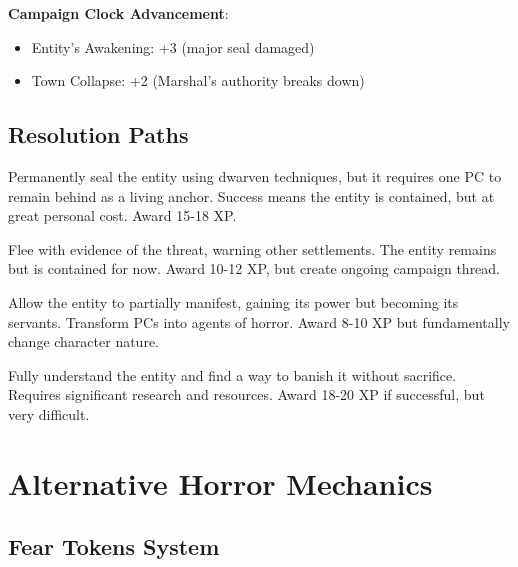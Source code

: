 \documentclass[11pt]{article}
\begin{document}
\textbf{Campaign Clock Advancement}:
\begin{itemize}[leftmargin=*]
\item Entity's Awakening: +3 (major seal damaged)
\item Town Collapse: +2 (Marshal's authority breaks down)
\end{itemize}

\subsection*{Resolution Paths}

\begin{description}[leftmargin=*]
\item[The Sacrifice] Permanently seal the entity using dwarven techniques, but it requires one PC to remain behind as a living anchor. Success means the entity is contained, but at great personal cost. Award 15-18 XP.
\item[The Escape] Flee with evidence of the threat, warning other settlements. The entity remains but is contained for now. Award 10-12 XP, but create ongoing campaign thread. 
\item[The Corruption] Allow the entity to partially manifest, gaining its power but becoming its servants. Transform PCs into agents of horror. Award 8-10 XP but fundamentally change character nature.
\item[The Investigation] Fully understand the entity and find a way to banish it without sacrifice. Requires significant research and resources. Award 18-20 XP if successful, but very difficult.
\end{description}

\section*{Alternative Horror Mechanics}

\subsection*{Fear Tokens System}
\end{document}
